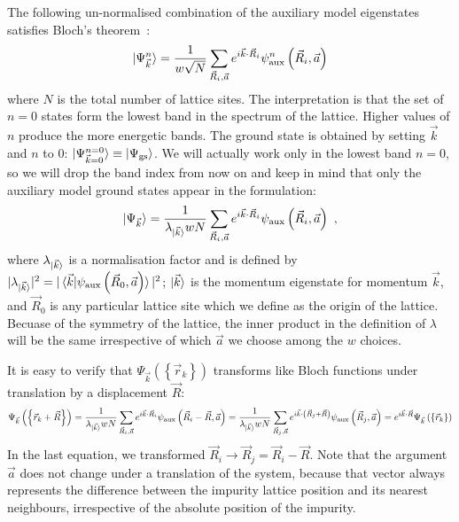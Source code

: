 \documentclass{report}
\numberwithin{equation}{section}
\begin{document}
The following un-normalised combination of the auxiliary model eigenstates satisfies Bloch's theorem~\cite{stoyanova}:
\begin{equation}\begin{aligned}
	\ket{\Psi^n_{\vec k}} = \frac{1}{w \sqrt N}\sum_{\vec R_i, \vec a} e^{i \vec{k}\cdot\vec{R}_i} \psi^n_\text{aux}\left(\vec R_i, \vec a\right)
\end{aligned}\end{equation}
where \(N\) is the total number of lattice sites. The interpretation is that the set of \(n=0\) states form the lowest band in the spectrum of the lattice. Higher values of \(n\) produce the more energetic bands. The ground state is obtained by setting \(\vec k\) and \(n\) to 0: \(\ket{\Psi_{\vec k=0}^{n=0}} \equiv \ket{\Psi_\text{gs}}\). We will actually work only in the lowest band \(n=0\), so we will drop the band index from now on and keep in mind that only the auxiliary model ground states appear in the formulation:
\begin{equation}\begin{aligned}
	\label{bloch-states}
	\ket{\Psi_{\vec k}} = \frac{1}{\lambda_{\ket{\vec k}} w N}\sum_{\vec R_i, \vec a} e^{i \vec{k}\cdot\vec{R}_i} \psi_\text{aux}\left(\vec R_i, \vec a\right)~,
\end{aligned}\end{equation}
where \(\lambda_{\ket{\vec k}}\) is a normalisation factor and is defined by \(|\lambda_{\ket{\vec k}}|^2 = |\braket{\vec k | \psi_\text{aux}\left(\vec R_0, \vec a\right)}|^2 \); \(\ket{\vec k}\) is the momentum eigenstate for momentum \(\vec k\), and \(\vec R_0\) is any particular lattice site which we define as the origin of the lattice. Becuase of the symmetry of the lattice, the inner product in the definition of \(\lambda\) will be the same irrespective of which \(\vec a\) we choose among the \(w\) choices.

It is easy to verify that \(\Psi_{\vec k}\left(\left\{ \vec r_k \right\}  \right) \) transforms like Bloch functions under translation by a displacement \(\vec R\):
\begin{equation}\begin{aligned}
	\Psi_{\vec k}\left(\left\{\vec r_k + \vec R\right\} \right) = \frac{1}{\lambda_{\ket{\vec k}} w N}\sum_{\vec R_i,\vec a} e^{i \vec{k}\cdot\vec{R}_i} \psi_\text{aux}\left(\vec R_i - \vec R, \vec a\right) = \frac{1}{\lambda_{\ket{\vec k}} w N}\sum_{\vec R_j, \vec a} e^{i \vec{k}\cdot\left(\vec{R}_j + \vec R\right)} \psi_\text{aux}\left(\vec R_j, \vec a\right) = e^{i \vec{k}\cdot\vec{R}} \Psi_{\vec k}\left(\left\{ \vec r_k \right\} \right)
\end{aligned}\end{equation}
In the last equation, we transformed \(\vec R_i \to \vec R_j = \vec R_i - \vec R\). Note that the argument \(\vec a\) does not change under a translation of the system, because that vector always represents the difference between the impurity lattice position and its nearest neighbours, irrespective of the absolute position of the impurity.
\end{document}
